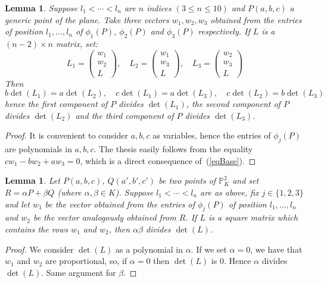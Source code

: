 \documentclass{amsart}
\theoremstyle{plain}
\newtheorem{lemma}[theorem]{Lemma}
\theoremstyle{definition}
\begin{document}
\begin{lemma} Suppose $l_1< \cdots <l_n$ are
  $n$ indices $(3 \leq n \leq 10)$ and $P(a, b, c)$ a generic point of
  the plane. Take three vectors $w_1, w_2, w_3$
  obtained from the entries of position $l_1, \dots, l_n$
  of $\phi_1(P)$, $\phi_2(P)$ and $\phi_3(P)$ respectively.
  If $L$ is a $(n-2) \times n$ matrix, set:
  \[
  L_1 = \left(\begin{array}{c}w_1 \\ w_2 \\ L\end{array}  \right), \quad
  L_2 = \left(\begin{array}{c}w_1 \\ w_3 \\ L\end{array}  \right), \quad
  L_3 = \left(\begin{array}{c}w_2 \\ w_3 \\ L\end{array}  \right)
  \]
  Then
  \[
  b \det(L_1) = a \det(L_2), \quad  
  c \det(L_1) = a \det(L_3), \quad  
  c \det(L_2) = b \det(L_3)
  \]
  hence the first component of $P$ divides $\det(L_1)$, the second
  component of $P$ divides $\det(L_2)$ and the third component of
  $P$ divides $\det(L_3)$.
  \label{lemma1}
\end{lemma}
\begin{proof} It is convenient to consider $a, b, c$ as variables, hence
  the entries of $\phi_j(P)$ are polynomials in $a, b, c$.
  The thesis easily follows from the equality $c w_1-b w_2+a w_3 = 0$, which
  is a direct consequence of~(\ref{eqBase}). 
\end{proof}

\begin{lemma}
  Let $P(a, b, c)$, $Q(a', b', c')$ be two points of $\mathbb{P}^2_K$
  and set $R = \alpha P+\beta Q$ (where $\alpha, \beta \in K$). 
  Suppose $l_1 < \cdots < l_n$ are as above, fix $j \in \{1, 2, 3\}$
  and   let $w_1$ be the vector obtained
  from the entries of $\phi_j(P)$ of position $l_1, \dots, l_n$ 
  and $w_2$ be the vector analogously obtained from $R$. If 
  $L$ is a square matrix which contains the
  rows $w_1$ and $w_2$, then $\alpha\beta$ divides $\det(L)$.
  \label{lemma2}
\end{lemma}
\begin{proof}
  We consider $\det(L)$ as a polynomial in $\alpha$.
  If we set $\alpha = 0$,
  we have that $w_1$ and $w_2$ are proportional, so, if $\alpha = 0$
  then $\det(L)$ is $0$. Hence $\alpha$ divides $\det(L)$. Same
  argument for $\beta$. 
\end{proof}
\end{document}
